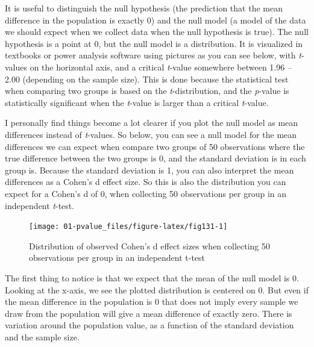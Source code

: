 \documentclass[
]{krantz}
\begin{document}
It is useful to distinguish the null hypothesis (the prediction that the mean difference in the population is exactly 0) and the null model (a model of the data we should expect when we collect data when the null hypothesis is true). The null hypothesis is a point at 0, but the null model is a distribution. It is visualized in textbooks or power analysis software using pictures as you can see below, with \emph{t}-values on the horizontal axis, and a critical \emph{t}-value somewhere between 1.96 -- 2.00 (depending on the sample size). This is done because the statistical test when comparing two groups is based on the \emph{t}-distribution, and the \emph{p}-value is statistically significant when the \emph{t}-value is larger than a critical \emph{t}-value.

I personally find things become a lot clearer if you plot the null model as mean differences instead of \emph{t}-values. So below, you can see a null model for the mean differences we can expect when compare two groups of 50 observations where the true difference between the two groups is 0, and the standard deviation is in each group is. Because the standard deviation is 1, you can also interpret the mean differences as a Cohen's d effect size. So this is also the distribution you can expect for a Cohen's d of 0, when collecting 50 observations per group in an independent \emph{t}-test.

\begin{figure}

{\centering \texttt{[image: 01-pvalue\_files/figure-latex/fig131-1]} 

}

\caption{Distribution of observed Cohen's d effect sizes when collecting 50 observations per group in an independent t-test}\label{fig:fig131}
\end{figure}

The first thing to notice is that we expect that the mean of the null model is 0. Looking at the x-axis, we see the plotted distribution is centered on 0. But even if the mean difference in the population is 0 that does not imply every sample we draw from the population will give a mean difference of exactly zero. There is variation around the population value, as a function of the standard deviation and the sample size.
\end{document}

